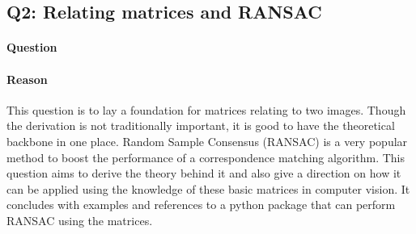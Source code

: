 \subsection*{Q2: Relating matrices and RANSAC}

\paragraph*{Question}
\begin{displayquote}
    \questionTwo
\end{displayquote}

\paragraph*{Reason}
This question is to lay a foundation for matrices relating to two images. Though the derivation is not traditionally important, it is good to have the theoretical backbone in one place. Random Sample Consensus (RANSAC) is a very popular method to boost the performance of a correspondence matching algorithm. This question aims to derive the theory behind it and also give a direction on how it can be applied using the knowledge of these basic matrices in computer vision. It concludes with examples and references to a python package that can perform RANSAC using the matrices.
